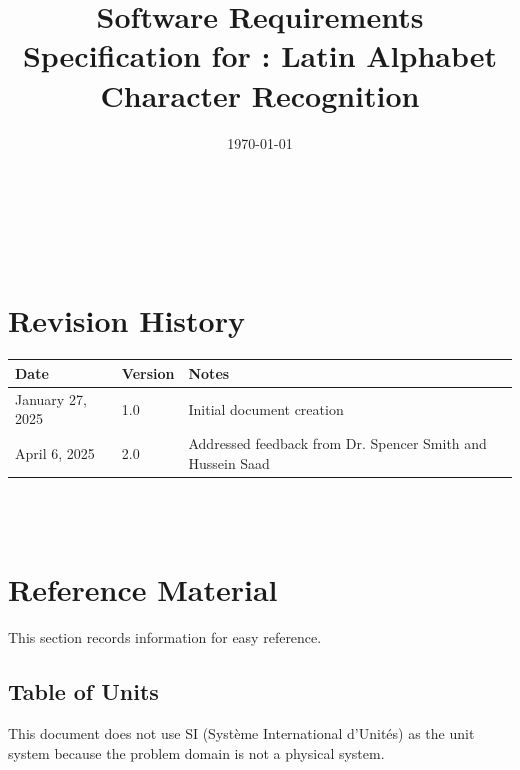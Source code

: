 \documentclass[12pt]{article}
\begin{document}
\title{Software Requirements Specification for \progname: Latin Alphabet Character Recognition} 
\author{\authname}
\date{\today}
	
\maketitle

~\newpage


\tableofcontents

~\newpage

\section*{Revision History}

\begin{tabularx}{\textwidth}{p{3cm}p{2cm}X}
\toprule {\bf Date} & {\bf Version} & {\bf Notes}\\
\midrule
January 27, 2025 & 1.0 & Initial document creation \\
April 6, 2025 & 2.0 & Addressed feedback from Dr. Spencer Smith and Hussein Saad\\
\bottomrule
\end{tabularx}

~\\

~\newpage

\section{Reference Material}

This section records information for easy reference.

\subsection{Table of Units}

This document does not use SI (Syst\`{e}me International d'Unit\'{e}s) as the
unit system because the problem domain is not a physical system.
~\newline
\end{document}
